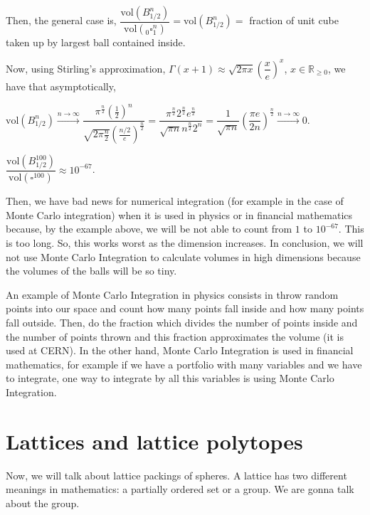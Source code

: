 Then, the general case is,
$\dfrac{\text{vol}(B^{n}_{1/2})}{\text{vol}(_{0}^{}\square_{1}^{n})} =
\text{vol}(B_{1/2}^{n}) =$ fraction of unit cube taken up by largest
ball contained inside.

Now, using Stirling's approximation, $\Gamma(x + 1) \approx \sqrt{2
  \pi x}\left(\dfrac{x}{e}\right)^{x}$, $x \in \mathbb{R}_{\geq 0}$,
we have that asymptotically,

$\text{vol}(B_{1/2}^{n})
\stackrel{n \rightarrow \infty}{\longrightarrow}
\dfrac{\pi^{\frac{n}{2}}(\frac{1}{2})^{n}}{\sqrt{2 \pi\frac{n}{2}}(\frac{n/2}{e})^{\frac{n}{2}}} =
\dfrac{\pi ^\frac{n}{2} 2^\frac{n}{2} e^\frac{n}{2}}{\sqrt{\pi n} n^\frac{n}{2} 2^{n}} =
\dfrac{1}{\sqrt{\pi n}}\left( \dfrac{\pi e}{2n} \right)^{\frac{n}{2}} 
\stackrel{n \rightarrow \infty}{\longrightarrow}
0$.

\begin{example} $\dfrac{\text{vol}(B_{1/2}^{100})}{\text{vol}(\square^{100})} \approx 10^{-67}$.
\end{example}

Then, we have bad news for numerical integration (for example in the
case of Monte Carlo integration) when it is used in physics or in
financial mathematics because, by the example above, we will be not
able to count from $1$ to $10^{-67}$. This is too long. So, this works
worst as the dimension increases. In conclusion, we will not use Monte
Carlo Integration to calculate volumes in high dimensions because the
volumes of the balls will be so tiny.

\begin{remark} An example of Monte Carlo Integration in physics
  consists in throw random points into our space and count how many
  points fall inside and how many points fall outside. Then, do the
  fraction which divides the number of points inside and the number of
  points thrown and this fraction approximates the volume (it is used
  at CERN). In the other hand, Monte Carlo Integration is used in
  financial mathematics, for example if we have a portfolio with many
  variables and we have to integrate, one way to integrate by all this
  variables is using Monte Carlo Integration.
\end{remark}


\section{Lattices and lattice polytopes}

Now, we will talk about lattice packings of spheres. A lattice has two
different meanings in mathematics: a partially ordered set or a
group. We are gonna talk about the group.

